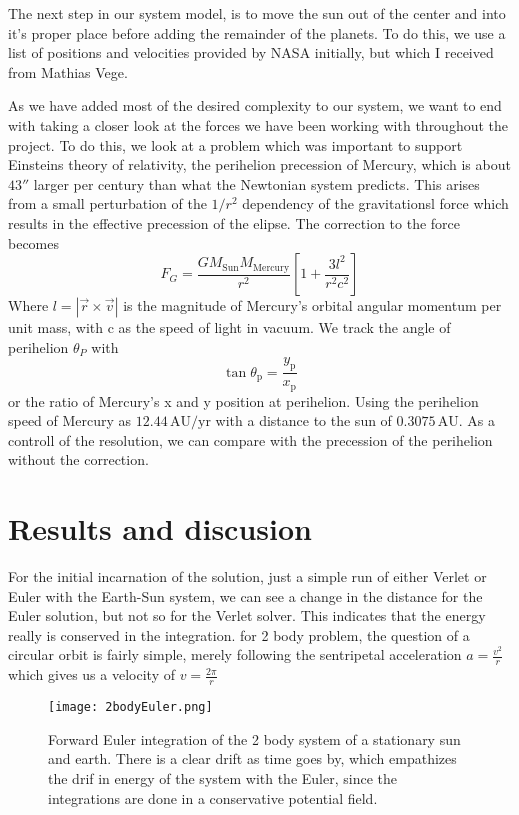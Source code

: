\documentclass[10pt, twocolumn]{revtex4-1}
\begin{document}
The next step in our system model, is to move the sun out of the center and into it's proper place before adding the remainder of the planets. To do this, 
we use a list of positions and velocities provided by NASA initially, but which I received from Mathias Vege\cite{MathiasPlanetvalues}.


As we have added most of the desired complexity to our system, we want to end with taking a closer look at the forces we have been working with throughout the 
project. To do this, we look at a problem which was important to support Einsteins theory of relativity, the perihelion precession of Mercury, which is about
$43''$ larger per century than what the Newtonian system predicts. This arises from a small perturbation of the $1/r^2$ dependency of the gravitationsl 
force which results in the effective precession of the elipse. The correction to the force becomes 
\[
F_G = \frac{GM_\mathrm{Sun}M_\mathrm{Mercury}}{r^2}\left[1 + \frac{3l^2}{r^2c^2}\right]
\]
Where $l=|\vec{r}\times\vec{v}|$ is the magnitude of Mercury's orbital angular momentum per unit mass, with c as the speed of light in vacuum. We track the
angle of perihelion $\theta_P$ with 
\[
\tan \theta_\mathrm{p} = \frac{y_\mathrm{p}}{x_\mathrm{p}}
\]
or the ratio of Mercury's x and y position at perihelion. Using the perihelion speed of Mercury as $12.44\,\mathrm{AU}/\mathrm{yr}$ with a distance to the 
sun of $0.3075\,\mathrm{AU}$. As a controll of the resolution, we can compare with the precession of the perihelion without the correction. 


\section{Results and discusion}

For the initial incarnation of the solution, just a simple run of either Verlet or Euler with the Earth-Sun system, we can see a change in the distance
for the Euler solution, but not so for the Verlet solver. This indicates that the energy really is conserved in the integration. for 2 body problem, the
question of a circular orbit is fairly simple, merely following the sentripetal acceleration $a = \frac{v^2}{r}$ which gives us a velocity of 
$v = \frac{2\pi }{r}$

\begin{figure}[hbtp]
    \texttt{[image: 2bodyEuler.png]}
    \caption{Forward Euler integration of the 2 body system of a stationary sun and earth. 
        There is a clear drift as time goes by, which empathizes the drif in energy of the 
        system with the Euler, since the integrations are done in a conservative potential
        field.} 
    \label{}
\end{figure}
\end{document}
